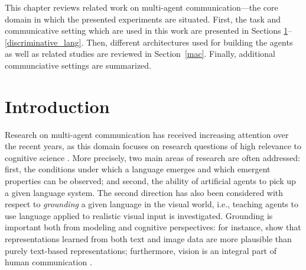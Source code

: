 
This chapter reviews related work on multi-agent communication---the core domain in which the presented experiments are situated. First, the task and communicative setting which are used in this work are presented in Sections \ref{related_work_intro}--\ref{discriminative_lang}. Then, different architectures used for building the agents as well as related studies are reviewed in Section~\ref{mac}. Finally, additional communciative settings are summarized.


\section{Introduction}
\label{related_work_intro}
Research on multi-agent communication has received increasing attention over the recent years, as this domain focuses on research questions of high relevance to cognitive science \parencite{lazaridou2020emergent}. More precisely, two main areas of research are often addressed: first, the conditions under which a language emerges and which emergent properties can be observed; and second, the ability of artificial agents to pick up a given language system. %
The second direction has also been considered with respect to \textit{grounding} a given language in the visual world, i.e., teaching agents to use language applied to realistic visual input is investigated. Grounding is important both from modeling and cognitive perspectives: for instance, \cite{bruni2014multimodal} show that representations learned from both text and image data are more plausible than purely text-based representations; furthermore, vision is an integral part of human communication \parencite{tomasello2010origins, harnad1990symbol, clark1991grounding}. 

